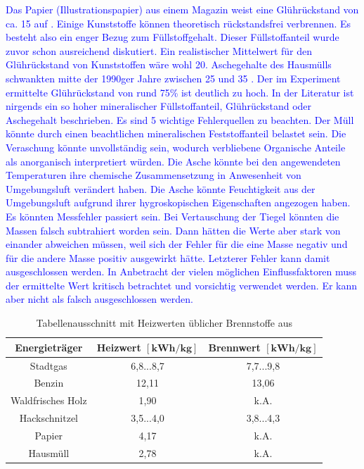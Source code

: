 \textcolor{blue}{Das Papier (Illustrationspapier) aus einem Magazin weist eine Glührückstand von ca. \SI{15}{\mpercent} auf \cite{roempppap}. Einige Kunststoffe können theoretisch rückstandsfrei verbrennen. Es besteht also ein enger Bezug zum Füllstoffgehalt. Dieser Füllstoffanteil wurde zuvor schon ausreichend diskutiert. Ein realistischer Mittelwert für den Glührückstand von Kunststoffen wäre wohl \SI{20}{\mpercent}.
	Aschegehalte des Hausmülls schwankten mitte der 1990ger Jahre zwischen \SI{25}{\mpercent} und \SI{35}{\mpercent} \cite{scholz2013}.
	Der im Experiment ermittelte Glührückstand von rund 75\% ist deutlich zu hoch. In der Literatur ist nirgends ein so hoher mineralischer Füllstoffanteil, Glührückstand oder Aschegehalt beschrieben. Es sind 5 wichtige Fehlerquellen zu beachten. Der Müll könnte durch einen beachtlichen mineralischen Feststoffanteil belastet sein. Die Veraschung könnte unvollständig sein, wodurch verbliebene Organische Anteile als anorganisch interpretiert würden. Die Asche könnte bei den angewendeten Temperaturen ihre chemische Zusammensetzung in Anwesenheit von Umgebungsluft verändert haben. Die Asche könnte Feuchtigkeit aus der Umgebungsluft aufgrund ihrer hygroskopischen Eigenschaften angezogen haben. Es könnten Messfehler passiert sein. Bei Vertauschung der Tiegel könnten die Massen falsch subtrahiert worden sein. Dann hätten die Werte aber stark von einander abweichen müssen, weil sich der Fehler für die eine Masse negativ und für die andere Masse positiv ausgewirkt hätte. Letzterer Fehler kann damit ausgeschlossen werden. 
	In Anbetracht der vielen möglichen Einflussfaktoren muss der ermittelte Wert kritisch betrachtet und vorsichtig verwendet werden. Er kann aber nicht als falsch ausgeschlossen werden.}

\vspace*{-3.5mm}
\renewcommand{\arraystretch}{1.2}
\begin{table}[h!]
	\centering
	\caption[Tabellenausschnitt mit Heizwerten üblicher Brennstoffe]{Tabellenausschnitt mit Heizwerten üblicher Brennstoffe aus \cite{S.Furkus.}}
	\label{tab:heizwerte}
	\begin{tabulary}{\textwidth}{C|CC}
		\hline
		\textbf{Energieträger} & \textbf{Heizwert $\boldsymbol{\left[\si{\kWh\per\kg}\right]}$} & \textbf{Brennwert $\boldsymbol{\left[\si{\kWh\per\kg}\right]}$} \\ 
		\hline
		Stadtgas			&	6,8...8,7	&	7,7...9,8\\
		Benzin				&	12,11	&	13,06\\
		Waldfrisches Holz	&	1,90	&	k.A.\\
		Hackschnitzel		&	3,5...4,0	&	3,8...4,3\\
		Papier 				& 	4,17 	&	k.A. \\	
		Hausmüll			&	2,78	&	k.A.\\
		\hline
	\end{tabulary}
\end{table}
\FloatBarrier
\vspace*{-2.5mm}


